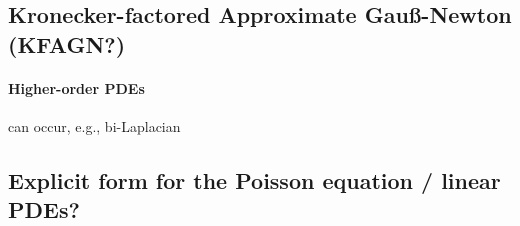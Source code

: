 \begin{comment}
    \paragraph{Alternating linear and nonlinear layers}
In particular, if $f$ is a linear and $g$ a nonlinear layer, we obtain 
\begin{align}
    \partial_i (f\circ g)(\vz) & = \mW \ve_i\sigma'(\vz_i) \quad \text{or } \jac (f\circ g)(\vz) = \mW \operatorname{diag}(\sigma'(\vz))  \\ 
    \partial_i\partial_j (f\circ g)(\vz) & = \mW \ve_i\delta_{ij} \sigma''(\vz_i). 
\end{align}
On the other hand, if $f$ is a nonlinear and $g$ a layer, we obtain 
\begin{align}
    \partial_i (f\circ g)(\vz) & =  \sigma'(\mW\vz + \vb) \odot \mW\ve_i\\ 
    \partial_i\partial_j (f\circ g)(\vz) & = \mW\ve_i \odot \sigma''(\mW\vz + \vb) \odot \mW\ve_j. 
\end{align}
Maybe, this doesn't really make all that much sense 
\end{comment}


\subsection{Kronecker-factored Approximate Gauß-Newton (KFAGN?)}\label{sec:KFAGN}

\paragraph{Higher-order PDEs}
can occur, e.g., bi-Laplacian


\subsection{Explicit form for the Poisson equation / linear PDEs?} 


